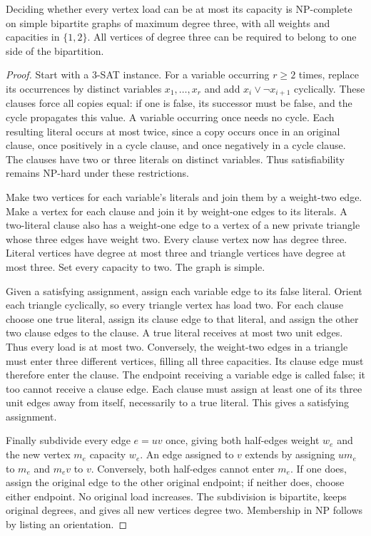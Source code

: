 \begin{lemma}\label{s3:co}
Deciding whether every vertex load can be at most its capacity is
NP-complete on simple bipartite graphs of maximum degree three, with all
weights and capacities in $\{1,2\}$. All vertices of degree three can be
required to belong to one side of the bipartition.
\end{lemma}
\begin{proof}
Start with a 3-SAT instance. For a variable occurring $r\ge2$ times,
replace its occurrences by distinct variables $x_1,\ldots,x_r$ and add
$x_i\vee\neg x_{i+1}$ cyclically. These clauses force all copies equal:
if one is false, its successor must be false, and the cycle propagates
this value. A variable occurring once needs no cycle. Each resulting
literal occurs at most twice, since a copy occurs once in an original
clause, once positively in a cycle clause, and once negatively in a cycle
clause. The clauses have two or three literals on distinct variables.
Thus satisfiability remains NP-hard under these restrictions.

Make two vertices for each variable's literals and join them by a
weight-two edge. Make a vertex for each clause and join it by weight-one
edges to its literals. A two-literal clause also has a weight-one edge to
a vertex of a new private triangle whose three edges have weight two.
Every clause vertex now has degree three. Literal vertices have degree at
most three and triangle vertices have degree at most three. Set every
capacity to two. The graph is simple.

Given a satisfying assignment, assign each variable edge to its false
literal. Orient each triangle cyclically, so every triangle vertex has
load two. For each clause choose one true literal, assign its clause edge
to that literal, and assign the other two clause edges to the clause.
A true literal receives at most two unit edges. Thus every load is at
most two. Conversely, the weight-two edges in a triangle must enter
three different vertices, filling all three capacities. Its clause edge
must therefore enter the clause. The endpoint receiving a variable edge
is called false; it too cannot receive a clause edge. Each clause must
assign at least one of its three unit edges away from itself, necessarily
to a true literal. This gives a satisfying assignment.

Finally subdivide every edge $e=uv$ once, giving both half-edges weight
$w_e$ and the new vertex $m_e$ capacity $w_e$. An edge assigned to $v$
extends by assigning $um_e$ to $m_e$ and $m_ev$ to $v$. Conversely, both
half-edges cannot enter $m_e$. If one does, assign the original edge to
the other original endpoint; if neither does, choose either endpoint.
No original load increases. The subdivision is bipartite, keeps original
degrees, and gives all new vertices degree two. Membership in NP follows
by listing an orientation.
\end{proof}

